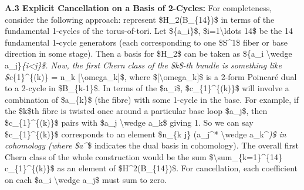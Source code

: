\documentclass[]{article}
\begin{document}
\textbf{A.3 Explicit Cancellation on a Basis of 2-Cycles:} For
completeness, consider the following approach: represent
\$H\_2(B\_\{14\})\$ in terms of the fundamental 1-cycles of the
torus-of-tori. Let \$\{a\_i\}\$, \$i=1\textbackslash{}ldots 14\$ be the
14 fundamental 1-cycle generators (each corresponding to one \$S\^{}1\$
fiber or base direction in some stage). Then a basis for \$H\_2\$ can be
taken as \$\{a\_i \textbackslash{}wedge a\_j\}\emph{\{i\textless{}j\}\$.
Now, the first Chern class of the \$k\$-th bundle is something like
\$c}\{1\}\^{}\{(k)\} = n\_k {[}\textbackslash{}omega\_k{]}\$, where
\${[}\textbackslash{}omega\_k{]}\$ is a 2-form Poincaré dual to a
2-cycle in \$B\_\{k-1\}\$. In terms of the \$a\_i\$,
\$c\_\{1\}\^{}\{(k)\}\$ will involve a combination of \$a\_\{k\}\$ (the
fibre) with some 1-cycle in the base. For example, if the \$k\$th fibre
is twisted once around a particular base loop \$a\_j\$, then
\$c\_\{1\}\^{}\{(k)\}\$ pairs with \$a\_j \textbackslash{}wedge a\_k\$
giving 1. So we can say \$c\_\{1\}\^{}\{(k)\}\$ corresponds to an
element \$n\_\{k j\} (a\_j\^{}* \textbackslash{}wedge a\_k\^{}\emph{)\$
in cohomology (where \$a\^{}}\$ indicates the dual basis in cohomology).
The overall first Chern class of the whole construction would be the sum
\$\textbackslash{}sum\_\{k=1\}\^{}\{14\} c\_\{1\}\^{}\{(k)\}\$ as an
element of \$H\^{}2(B\_\{14\})\$. For cancellation, each coefficient on
each \$a\_i \textbackslash{}wedge a\_j\$ must sum to zero.
\end{document}
